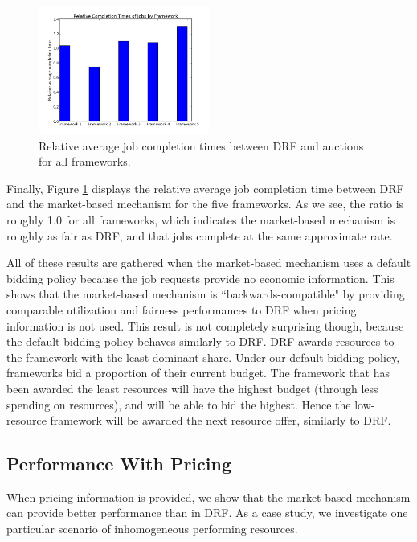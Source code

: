 \documentclass{acm_proc_article-sp}
\begin{document}
\begin{figure}

\includegraphics[width=0.5\textwidth]{images/relative_completion_times.png}
\caption{Relative average job completion times between DRF and auctions for all frameworks.}
\label{img:relative}
\end{figure}

Finally, Figure \ref{img:relative} displays the relative average job completion time between DRF and the market-based mechanism for the five frameworks. As we see, the ratio is roughly 1.0 for all frameworks, which indicates the market-based mechanism is roughly as fair as DRF, and that jobs complete at the same approximate rate.

All of these results are gathered when the market-based mechanism uses a default bidding policy because the job requests provide no economic information. This shows that the market-based mechanism is ``backwards-compatible" by providing comparable utilization and fairness performances to DRF when pricing information is not used. This result is not completely surprising though, because the default bidding policy behaves similarly to DRF. DRF awards resources to the framework with the least dominant share. Under our default bidding policy, frameworks bid a proportion of their current budget. The framework that has been awarded the least resources will have the highest budget (through less spending on resources), and will be able to bid the highest. Hence the low-resource framework will be awarded the next resource offer, similarly to DRF.

\subsection{Performance With Pricing}

When pricing information is provided, we show that the market-based mechanism can provide better performance than in DRF. As a case study, we investigate one particular scenario of inhomogeneous performing resources. 
\end{document}
